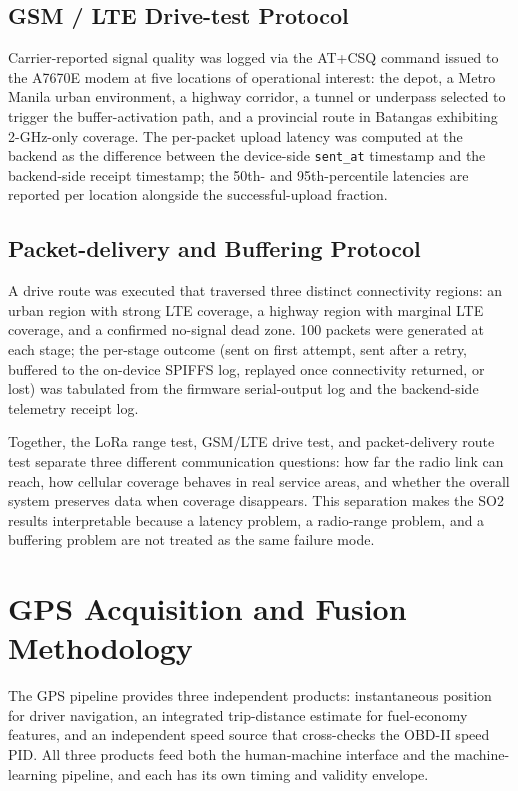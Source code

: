 \subsection{GSM / LTE Drive-test Protocol}
Carrier-reported signal quality was logged via the AT+CSQ command issued to the A7670E modem at five locations of operational interest: the depot, a Metro Manila urban environment, a highway corridor, a tunnel or underpass selected to trigger the buffer-activation path, and a provincial route in Batangas exhibiting 2-GHz-only coverage. The per-packet upload latency was computed at the backend as the difference between the device-side \texttt{sent\_at} timestamp and the backend-side receipt timestamp; the 50th- and 95th-percentile latencies are reported per location alongside the successful-upload fraction.

\subsection{Packet-delivery and Buffering Protocol}
A drive route was executed that traversed three distinct connectivity regions: an urban region with strong LTE coverage, a highway region with marginal LTE coverage, and a confirmed no-signal dead zone. 100 packets were generated at each stage; the per-stage outcome (sent on first attempt, sent after a retry, buffered to the on-device SPIFFS log, replayed once connectivity returned, or lost) was tabulated from the firmware serial-output log and the backend-side telemetry receipt log.

Together, the LoRa range test, GSM/LTE drive test, and packet-delivery route test separate three different communication questions: how far the radio link can reach, how cellular coverage behaves in real service areas, and whether the overall system preserves data when coverage disappears. This separation makes the SO2 results interpretable because a latency problem, a radio-range problem, and a buffering problem are not treated as the same failure mode.

\section{GPS Acquisition and Fusion Methodology}
\label{sec:gps_pipeline}

The GPS pipeline provides three independent products: instantaneous position for driver navigation, an integrated trip-distance estimate for fuel-economy features, and an independent speed source that cross-checks the OBD-II speed PID. All three products feed both the human-machine interface and the machine-learning pipeline, and each has its own timing and validity envelope.


